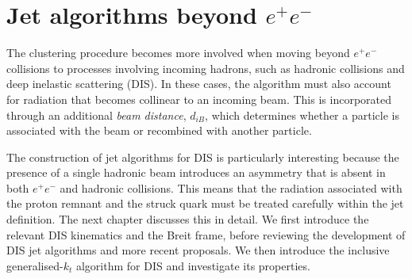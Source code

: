 \section{Jet algorithms beyond $e^+e^-$}
\label{sec:beyond-ee}

The clustering procedure becomes more involved when moving beyond
$e^+e^-$ collisions to processes involving incoming hadrons, such as
hadronic collisions and deep inelastic scattering (DIS). In these cases,
the algorithm must also account for radiation that becomes collinear to an
incoming beam. This is incorporated through an additional \emph{beam
distance}, $d_{iB}$, which determines whether a particle is associated
with the beam or recombined with another particle.

The construction of jet algorithms for DIS is particularly interesting
because the presence of a single hadronic beam introduces an asymmetry that
is absent in both $e^+e^-$ and hadronic collisions. This means that the
radiation associated with the proton remnant and the struck quark must be
treated carefully within the jet definition. The next chapter discusses
this in detail. We first introduce the relevant DIS kinematics and the
Breit frame, before reviewing the development of DIS jet algorithms and
more recent proposals. We then introduce the inclusive generalised-$k_t$
algorithm for DIS and investigate its properties.
